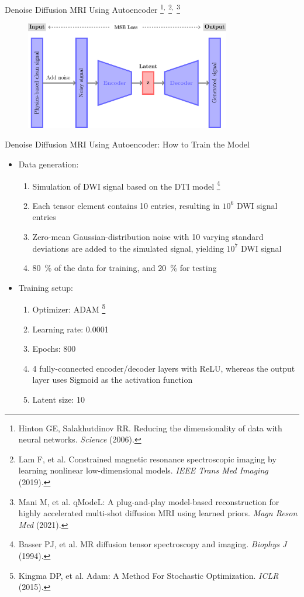 \documentclass[hyperref={colorlinks=true,linkcolor=blue}, aspectratio=169]{beamer}
\begin{document}
	\begin{frame}{Denoise Diffusion MRI Using Autoencoder \footnote{Hinton GE, Salakhutdinov RR. Reducing the dimensionality of data with neural networks. \textit{Science} (2006).}$^,$
		\footnote{Lam F, et al. Constrained magnetic resonance spectroscopic imaging by learning nonlinear low-dimensional models. \textit{IEEE Trans Med Imaging} (2019).}$^,$
		\footnote{Mani M, et al. qModeL: A plug-and-play model-based reconstruction for highly accelerated multi-shot diffusion MRI using learned priors. \textit{Magn Reson Med} (2021).}}
		\begin{figure}
			\centering
			\includegraphics[width=0.8\textwidth]{figures/dae.pdf}
		\end{figure}
	\end{frame}

	\begin{frame}{Denoise Diffusion MRI Using Autoencoder: How to Train the Model}
		\begin{itemize}
			\item Data generation:

			\begin{enumerate}
				\item Simulation of DWI signal based on the DTI model \footnote{Basser PJ, et al. MR diffusion tensor spectroscopy and imaging. \textit{Biophys J} (1994).}
				\item Each tensor element contains 10 entries, resulting in $10^6$ DWI signal entries
				\item Zero-mean Gaussian-distribution noise with 10 varying standard deviations are added to the simulated signal, yielding $10^7$ DWI signal
				\item \SI{80}{\percent} of the data for training, and \SI{20}{\percent} for testing
			\end{enumerate}
			\vspace{1em}
			\item Training setup:
			\begin{enumerate}
				\item Optimizer: ADAM \footnote{Kingma DP, et al. Adam: A Method For Stochastic Optimization. \textit{ICLR} (2015).}
				\item Learning rate: 0.0001
				\item Epochs: 800
				\item 4 fully-connected encoder/decoder layers with ReLU, whereas the output layer uses Sigmoid as the activation function
				\item Latent size: 10
			\end{enumerate}
		\end{itemize}
	\end{frame}
	
\end{document}
